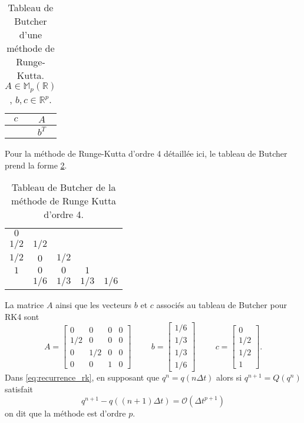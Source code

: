 \begin{table}[htbp]
\begin{center}
\begin{tabular}{c|c}
$c$ & $A$ \\
\hline
    & $b^T$
\end{tabular}
\end{center}
\caption{Tableau de Butcher d'une méthode de Runge-Kutta. $A \in \mathbb{M}_p(\mathbb{R})$, $b,c \in \mathbb{R}^p$.}
\label{tab:butcher}
\end{table}
Pour la méthode de Runge-Kutta d'ordre 4 détaillée ici, le tableau de Butcher prend la forme \ref{tab:butcher_rk4}.
\begin{table}[htbp]
\begin{center}
\begin{tabular}{c|cccc}
$0$   &       &      &      &      \\
$1/2$ & $1/2$ &      &      &      \\
$1/2$ & $0$   & $1/2$&      &      \\
$1$   & $0$   & $0$  & $1$  &      \\  
\hline
      & $1/6$ & $1/3$& $1/3$& $1/6$\\
\end{tabular}
\end{center}
\caption{Tableau de Butcher de la méthode de Runge Kutta d'ordre 4.}
\label{tab:butcher_rk4}
\end{table}
La matrice $A$ ainsi que les vecteurs $b$ et $c$ associés au tableau de Butcher pour RK4 sont
\begin{equation}
A= \begin{bmatrix}
0 & 0 & 0 & 0 \\
1/2& 0& 0 & 0 \\
0 &1/2& 0 & 0 \\
0 & 0 & 1 & 0
\end{bmatrix}
\hspace{1cm}
b=\begin{bmatrix}
1/6\\1/3\\1/3\\1/6
\end{bmatrix}
\hspace{1cm}
c=\begin{bmatrix}
0\\1/2\\1/2\\1
\end{bmatrix}.
\end{equation}
Dans \eqref{eq:recurrence_rk}, en supposant que $q^n = q(n \Delta t)$ alors si $q^{n+1}=Q(q^n)$ satisfait 
\begin{equation}
q^{n+1} - q((n+1) \Delta t) = \mathcal{O}(\Delta t^{p+1})
\end{equation}
on dit que la méthode est d'ordre $p$.

